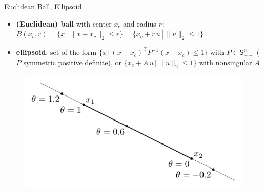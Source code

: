 \documentclass[10pt,handout]{beamer}
\newcommand{\ds}{\displaystyle}
\theoremstyle{definition}
\begin{document}
\begin{frame}{Euclidean Ball, Ellipsoid}
  \begin{itemize}
    \item {\bf (Euclidean) ball} with center $x_c$ and radius $r$: \\ $\ds B(x_c, r) = \{x\,|\,\|x - x_c\|_2\leqslant r\} = \{x_c + r\,u\,|\,\|u\|_2 \leqslant 1\}$
    \item {\bf ellipsoid}: set of the form $\ds\{x\,|\,(x - x_c)^\top P^{-1}(x - x_c)\leqslant 1\}$ with $P\in\mathsf{S}_{++}^n$ ($P$ symmetric positive definite), or $\ds\{x_c + A\,u\,|\,\|u\|_2 \leqslant 1\}$ with nonsingular $A$
  \end{itemize}
  \begin{figure}[!htbp]
    \centering
    \includegraphics[scale=0.9,page=9]{fig/note06/02.pdf}
  \end{figure}
\end{frame}
\end{document}
